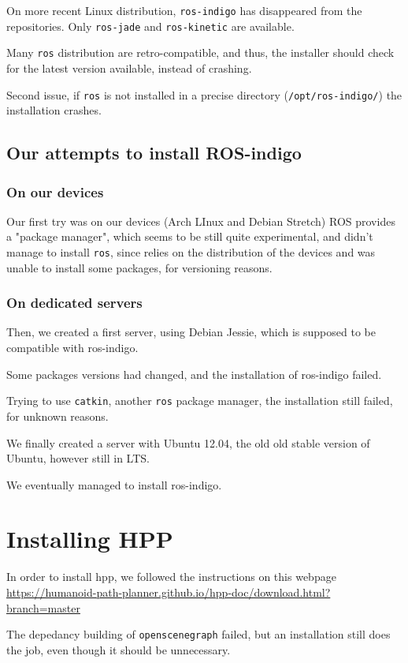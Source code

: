 \documentclass[a4paper, 11pt, titlepage]{article}
\begin{document}
On more recent Linux distribution, \verb|ros-indigo| has disappeared from the
repositories. Only \verb|ros-jade| and \verb|ros-kinetic| are available.

Many \verb|ros| distribution are retro-compatible, and thus, the installer
should check for the latest version available, instead of crashing.

Second issue, if \verb|ros| is not installed in a precise directory
(\verb|/opt/ros-indigo/|) the installation crashes.

\subsection{Our attempts to install ROS-indigo}

\subsubsection{On our devices}

    Our first try was on our devices (Arch LInux and Debian Stretch)
    ROS provides a "package manager", which seems to be still quite
    experimental, and didn't manage to install \verb|ros|, since relies on the
    distribution of the devices and was unable to install some packages, for
    versioning reasons.

\subsubsection{On dedicated servers}

    Then, we created a first server, using Debian Jessie, which is supposed to
    be compatible with ros-indigo.

    Some packages versions had changed, and the installation of ros-indigo failed.

    Trying to use \verb|catkin|, another \verb|ros| package manager, the
    installation still failed, for unknown reasons.

    We finally created a server with Ubuntu 12.04, the old old stable version of
    Ubuntu, however still in LTS.

    We eventually managed to install ros-indigo.

\section{Installing HPP}

In order to install hpp, we followed the instructions on this webpage
\url{https://humanoid-path-planner.github.io/hpp-doc/download.html?branch=master}

The depedancy building of \verb|openscenegraph| failed, but an installation
still does the job, even though it should be unnecessary.
\end{document}

